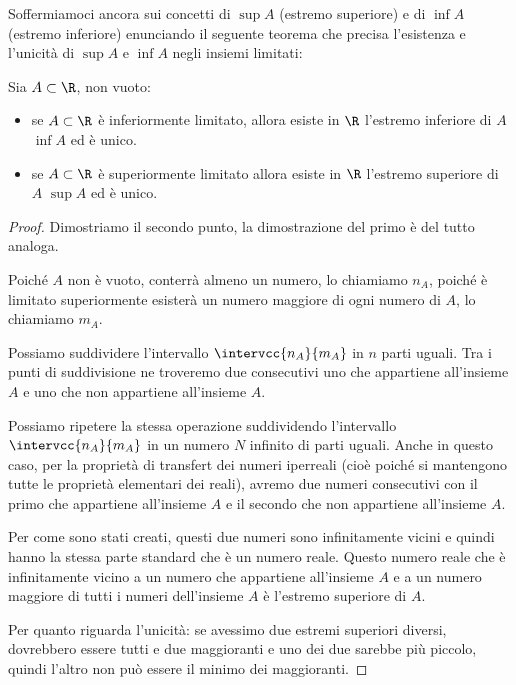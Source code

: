 Soffermiamoci ancora sui concetti di \(\sup{A}\) (estremo superiore) e 
di \(\inf{A}\) (estremo inferiore) enunciando il seguente teorema che 
precisa l'esistenza e l'unicità di \(\sup{A}\) e \(\inf{A}\) negli insiemi 
limitati:
\begin{newtheo}
Sia \(A\subset\R\), non vuoto:
\begin{itemize} [nosep]
\item se \(A \subset \R\) è inferiormente limitato, allora esiste in \(\R\) 
l'estremo inferiore di \(A\) \(\inf{A}\) ed è unico.
\item se \(A \subset \R\) è superiormente limitato allora esiste in \(\R\) 
l'estremo superiore di \(A\) \(\sup{A}\) ed è unico.
\end{itemize}
\end{newtheo}
\begin{proof}
Dimostriamo il secondo punto, la dimostrazione del primo è del tutto 
analoga.

Poiché \(A\) non è vuoto, conterrà almeno un numero, lo chiamiamo \(n_A\), 
poiché è limitato superiormente esisterà un numero maggiore di ogni numero 
di \(A\), lo chiamiamo \(m_A\).

Possiamo suddividere l'intervallo \(\intervcc{n_A}{m_A}\) in \(n\) parti 
uguali.
Tra i punti di suddivisione ne troveremo due consecutivi uno che appartiene 
all'insieme \(A\) e uno che non appartiene all'insieme \(A\).

Possiamo  ripetere la stessa operazione suddividendo l'intervallo 
\(\intervcc{n_A}{m_A}\) in un numero \(N\) infinito di parti uguali.
Anche in questo caso, per la proprietà di transfert dei numeri iperreali 
(cioè poiché si mantengono tutte le proprietà elementari dei reali), avremo 
due numeri consecutivi con il primo che appartiene all'insieme \(A\) e il 
secondo che non appartiene all'insieme \(A\).

Per come sono stati creati, questi due numeri sono infinitamente vicini e 
quindi hanno la stessa parte standard che è un numero reale.
Questo numero reale che è infinitamente vicino a un numero che appartiene 
all'insieme \(A\) e a un numero maggiore di tutti i numeri dell'insieme 
\(A\) è l'estremo superiore di \(A\).

Per quanto riguarda l'unicità: se avessimo due estremi superiori diversi, 
dovrebbero essere tutti e due maggioranti e uno dei due sarebbe più piccolo, 
quindi l'altro non può essere il minimo dei maggioranti.
\end{proof}

